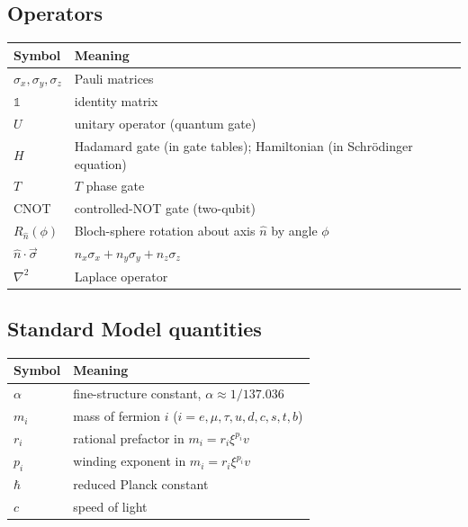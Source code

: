 \subsection*{Operators}

\begin{center}
\renewcommand{\arraystretch}{1.3}
{\small
\begin{tabular}{>{\raggedright\arraybackslash}p{2.5cm}>{\raggedright\arraybackslash}p{8.5cm}}
\toprule
\textbf{Symbol} & \textbf{Meaning} \\
\midrule
$\sigma_x, \sigma_y, \sigma_z$ & Pauli matrices \\
$\mathbb{1}$ & identity matrix \\
$U$ & unitary operator (quantum gate) \\
$H$ & Hadamard gate (in gate tables); Hamiltonian (in Schrödinger equation) \\
$T$ & $T$ phase gate \\
CNOT & controlled-NOT gate (two-qubit) \\
$R_{\hat n}(\phi)$ & Bloch-sphere rotation about axis $\hat n$ by angle $\phi$ \\
$\hat n \cdot \vec\sigma$ & $n_x\sigma_x + n_y\sigma_y + n_z\sigma_z$ \\
$\nabla^2$ & Laplace operator \\
\bottomrule
\end{tabular}
}
\renewcommand{\arraystretch}{1.0}
\end{center}

\subsection*{Standard Model quantities}

\begin{center}
\renewcommand{\arraystretch}{1.3}
{\small
\begin{tabular}{>{\raggedright\arraybackslash}p{2.5cm}>{\raggedright\arraybackslash}p{8.5cm}}
\toprule
\textbf{Symbol} & \textbf{Meaning} \\
\midrule
$\alpha$ & fine-structure constant, $\alpha \approx 1/137.036$ \\
$m_i$ & mass of fermion $i$ ($i = e, \mu, \tau, u, d, c, s, t, b$) \\
$r_i$ & rational prefactor in $m_i = r_i \xi^{p_i} v$ \\
$p_i$ & winding exponent in $m_i = r_i \xi^{p_i} v$ \\
$\hbar$ & reduced Planck constant \\
$c$ & speed of light \\
\bottomrule
\end{tabular}
}
\renewcommand{\arraystretch}{1.0}
\end{center}

